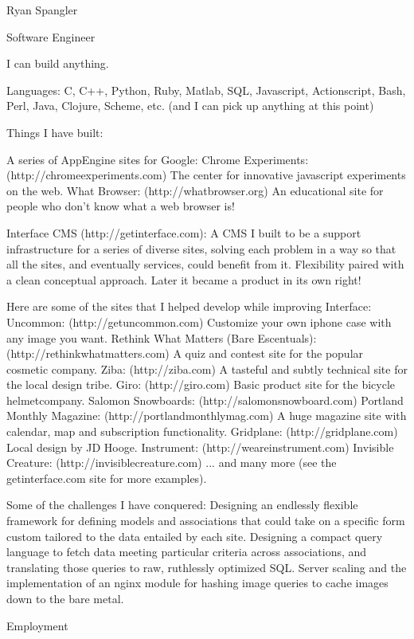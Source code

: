Ryan Spangler

Software Engineer
 
I can build anything.

Languages:
C, C++, Python, Ruby, Matlab, SQL, Javascript, Actionscript, Bash, Perl, Java, Clojure, Scheme, etc. (and I can pick up anything at this point)

Things I have built:

A series of AppEngine sites for Google:
  Chrome Experiments: (http://chromeexperiments.com) The center for innovative javascript experiments on the web.
  What Browser: (http://whatbrowser.org) An educational site for people who don't know what a web browser is!

Interface CMS (http://getinterface.com):  A CMS I built to be a support infrastructure for a series of diverse sites, solving each problem in a way so that all the sites, and eventually services, could benefit from it.  Flexibility paired with a clean conceptual approach.  Later it became a product in its own right!

Here are some of the sites that I helped develop while improving Interface:
  Uncommon: (http://getuncommon.com) Customize your own iphone case with any image you want.
  Rethink What Matters (Bare Escentuals): (http://rethinkwhatmatters.com) A quiz and contest site for the popular cosmetic company.
  Ziba: (http://ziba.com) A tasteful and subtly technical site for the local design tribe.
  Giro: (http://giro.com) Basic product site for the bicycle helmetcompany.
  Salomon Snowboards: (http://salomonsnowboard.com)
  Portland Monthly Magazine: (http://portlandmonthlymag.com) A huge magazine site with calendar, map and subscription functionality.
  Gridplane: (http://gridplane.com) Local design by JD Hooge.
  Instrument: (http://weareinstrument.com)
  Invisible Creature: (http://invisiblecreature.com)
  ... and many more (see the getinterface.com site for more examples).

Some of the challenges I have conquered:
  Designing an endlessly flexible framework for defining models and associations that could take on a specific form custom tailored to the data entailed by each site.
  Designing a compact query language to fetch data meeting particular criteria across associations, and translating those queries to raw, ruthlessly optimized SQL.
  Server scaling and the implementation of an nginx module for hashing image queries to cache images down to the bare metal. 

Employment

